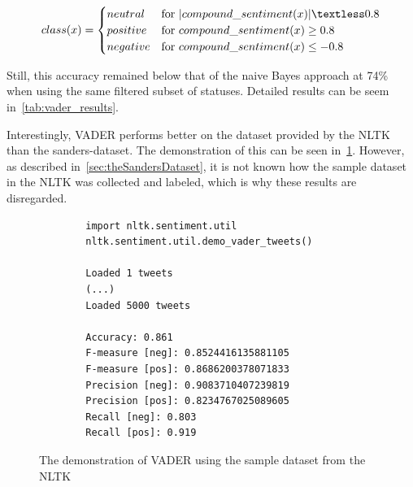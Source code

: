 \begin{equation}
   class(x) =
   \begin{cases}
     neutral & \text{for } |compound\_sentiment(x)| \textless 0.8 \\
     positive & \text{for } compound\_sentiment(x) \geq 0.8 \\
     negative & \text{for } compound\_sentiment(x) \leq -0.8 \\
   \end{cases}
\end{equation}

Still, this accuracy remained below that of the naive Bayes approach at 74\% when using the same filtered subset of statuses.
Detailed results can be seem in~\ref{tab:vader_results}.

\begin{table}
    \caption{Sentiment classification using VADER}
    \label{tab:vader_results}
\end{table}

Interestingly, VADER performs better on the dataset provided by the NLTK than the sanders-dataset.
The demonstration of this can be seen in~\ref{code:vader_demo}.
However, as described in~\ref{sec:theSandersDataset}, it is not known how the sample dataset in the NLTK was collected and labeled,
which is why these results are disregarded.

\begin{figure}
    \caption{The demonstration of VADER using the sample dataset from the NLTK}
    \label{code:vader_demo}
    \begin{verbatim}
        import nltk.sentiment.util
        nltk.sentiment.util.demo_vader_tweets()

        Loaded 1 tweets
        (...)
        Loaded 5000 tweets

        Accuracy: 0.861
        F-measure [neg]: 0.8524416135881105
        F-measure [pos]: 0.8686200378071833
        Precision [neg]: 0.9083710407239819
        Precision [pos]: 0.8234767025089605
        Recall [neg]: 0.803
        Recall [pos]: 0.919
    \end{verbatim}
\end{figure}


